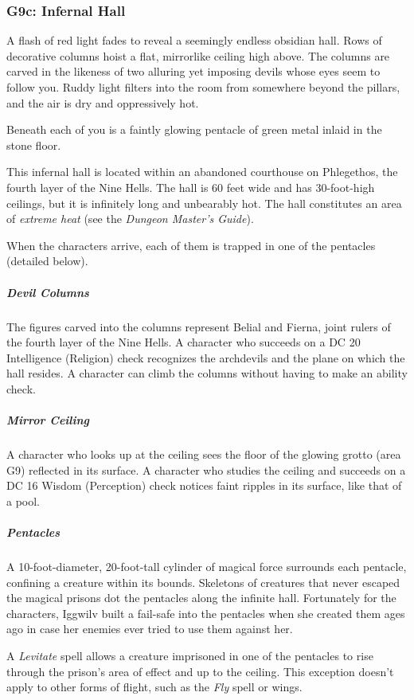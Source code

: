 \documentclass[10pt,a4paper,twoside,bg=print,twocolumn,openany,nodeprecatedcode]{dndbook}
\begin{document}
\subsubsection{G9c: Infernal Hall}
\begin{DndReadAloud}{}
A flash of red light fades to reveal a seemingly endless obsidian hall. Rows of decorative columns hoist a flat, mirrorlike ceiling high above. The columns are carved in the likeness of two alluring yet imposing devils whose eyes seem to follow you. Ruddy light filters into the room from somewhere beyond the pillars, and the air is dry and oppressively hot.

Beneath each of you is a faintly glowing pentacle of green metal inlaid in the stone floor.

\end{DndReadAloud}

This infernal hall is located within an abandoned courthouse on Phlegethos, the fourth layer of the Nine Hells. The hall is 60 feet wide and has 30-foot-high ceilings, but it is infinitely long and unbearably hot. The hall constitutes an area of \textit{extreme heat} (see the \textit{Dungeon Master's Guide}).

When the characters arrive, each of them is trapped in one of the pentacles (detailed below).

\subparagraph{Devil Columns}
The figures carved into the columns represent Belial and Fierna, joint rulers of the fourth layer of the Nine Hells. A character who succeeds on a DC 20 Intelligence (Religion) check recognizes the archdevils and the plane on which the hall resides. A character can climb the columns without having to make an ability check.

\subparagraph{Mirror Ceiling}
A character who looks up at the ceiling sees the floor of the glowing grotto (area G9) reflected in its surface. A character who studies the ceiling and succeeds on a DC 16 Wisdom (Perception) check notices faint ripples in its surface, like that of a pool.

\subparagraph{Pentacles}
A 10-foot-diameter, 20-foot-tall cylinder of magical force surrounds each pentacle, confining a creature within its bounds. Skeletons of creatures that never escaped the magical prisons dot the pentacles along the infinite hall. Fortunately for the characters, Iggwilv built a fail-safe into the pentacles when she created them ages ago in case her enemies ever tried to use them against her.

A \textit{Levitate} spell allows a creature imprisoned in one of the pentacles to rise through the prison's area of effect and up to the ceiling. This exception doesn't apply to other forms of flight, such as the \textit{Fly} spell or wings.
\end{document}
